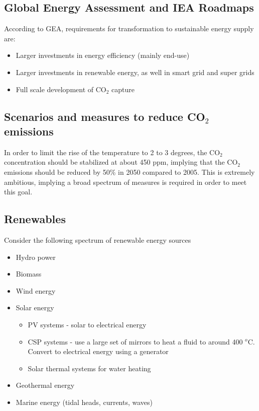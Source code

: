 \documentclass[a4paper,10pt]{article}
\begin{document}
\subsection{Global Energy Assessment and IEA Roadmaps}
According to GEA, requirements for transformation to sustainable energy supply are:
\begin{itemize}
 \item Larger investments in energy efficiency (mainly end-use)
 \item Larger investments in renewable energy, as well in smart grid and super grids
 \item Full scale development of CO$_2$ capture
\end{itemize}

\subsection{Scenarios and measures to reduce CO$_2$ emissions}

In order to limit the rise of the temperature to 2 to 3 degrees, the CO$_2$ concentration should be stabilized at about 450 ppm, implying that the CO$_2$ emissions should be reduced by 50\% in 2050 compared to 2005. This is extremely ambitious, implying a broad spectrum of measures is required in order to meet this goal.

\subsection{Renewables}
Consider the following spectrum of renewable energy sources
\begin{itemize}
 \item Hydro power
 \item Biomass
 \item Wind energy
 \item Solar energy
 \begin{itemize}
 \item PV systems - solar to electrical energy
 \item CSP systems - use a large set of mirrors to heat a fluid to around 400 $^o$C. Convert to electrical energy using a generator
 \item Solar thermal systems for water heating
 \end{itemize}
 \item Geothermal energy
 \item Marine energy (tidal heads, currents, waves)
\end{itemize}
\end{document}
